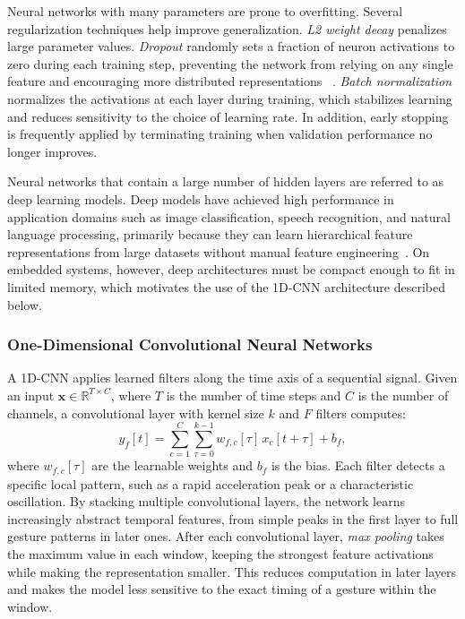 Neural networks with many parameters are prone to overfitting. Several regularization techniques help improve generalization. \emph{L2 weight decay} penalizes large parameter values. \emph{Dropout} randomly sets a fraction of neuron activations to zero during each training step, preventing the network from relying on any single feature and encouraging more distributed representations ~\cite{goodfellow2016dl}. \emph{Batch normalization} normalizes the activations at each layer during training, which stabilizes learning and reduces sensitivity to the choice of learning rate. In addition, early stopping is frequently applied by terminating training when validation performance no longer improves.

Neural networks that contain a large number of hidden layers are referred to as deep learning models. Deep models have achieved high performance in application domains such as image classification, speech recognition, and natural language processing, primarily because they can learn hierarchical feature representations from large datasets without manual feature engineering~\cite{goodfellow2016dl}. On embedded systems, however, deep architectures must be compact enough to fit in limited memory, which motivates the use of the 1D-CNN architecture described below.

\subsubsection{One-Dimensional Convolutional Neural Networks}
A 1D-CNN applies learned filters along the time axis of a sequential signal. Given an input $\mathbf{x} \in \mathbb{R}^{T \times C}$, where $T$ is the number of time steps and $C$ is the number of channels, a convolutional layer with kernel size $k$ and $F$ filters computes:
\begin{equation}
  y_f[t] = \sum_{c=1}^{C} \sum_{\tau=0}^{k-1} w_{f,c}[\tau]\, x_c[t + \tau] + b_f,
\end{equation}
where $w_{f,c}[\tau]$ are the learnable weights and $b_f$ is the bias. Each filter detects a specific local pattern, such as a rapid acceleration peak or a characteristic oscillation. By stacking multiple convolutional layers, the network learns increasingly abstract temporal features, from simple peaks in the first layer to full gesture patterns in later ones. After each convolutional layer, \emph{max pooling} takes the maximum value in each window, keeping the strongest feature activations while making the representation smaller. This reduces computation in later layers and makes the model less sensitive to the exact timing of a gesture within the window.

